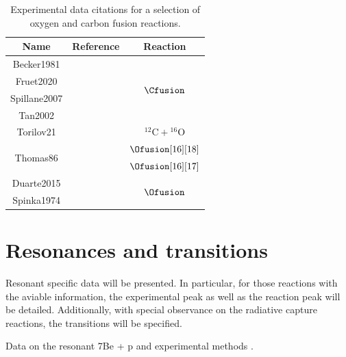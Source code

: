 \documentclass[openany]{book}
\begin{document}
 
\begin{table}[H]
	\centering
	\begin{tabular}{|c|c|c|}
		\hline
		Name & Reference & Reaction \\ \hline
		Becker1981 &   \cite{becker_kettner_rolfs_trautvetter_1981}  &    \multirow{4}{*}{$\Cfusion$} \\ \cline{1-2}
		Fruet2020 &  \cite{fruet_courtin_heine_jenkins_adsley_brown_canavan_catford_charon_curien_et_2020}          & \\ \cline{1-2}
		Spillane2007 &   \cite{spillane_raiola_rolfs_schurmann_strieder_zeng_becker_bordeanu_gialanella_romano_et_2007}  &   \\ \cline{1-2}
		Tan2002 &    \cite{tan_boeltzig_dulal_deboer_frentz_henderson_howard_kelmar_kolata_long_et_2020}  & \\ \hline
		Torilov21  &  \cite{torilov_maltsev_zherebchevsky_2021}     & $\mathrm{{}^{12}C + {}^{16}O}$       \\ \hline
		\multirow{2}{*}{Thomas86} & \multirow{2}{*}{  \cite{thomas_chen_hinds_meredith_olson_1986} }  &     $\Ofusion[16][18]$  \\ \cline{3-3} 
	 	 &  &     $\Ofusion[16][17]$ \\ \hline
		Duarte2015  &   \cite{duarte_gasques_oliveira_zagatto_chamon_medina_added_seale_alcantara-nunez_rossi_et_2015} & \multirow{2}{*}{ $\Ofusion$}  \\ \cline{1-2} 
		Spinka1974   &  \cite{spinka_winkler_1974}  &  \\ \hline
	\end{tabular}
	\caption[References oxygen and carbon fusion experimental data]{Experimental data citations for a selection of oxygen and carbon fusion reactions.}
\label{table:fusion}
\end{table}
 
\section{Resonances and transitions} \label{sec:resonancesTransitions}

Resonant specific data will be presented. In particular, for those reactions with the aviable information, the experimental peak as well as the reaction peak will be detailed. Additionally, with special observance on the radiative capture reactions, the transitions will be specified.

Data on the resonant 7Be + p and experimental methods \cite{buompane_dileva_gialanella_d'onofrio_decesare_duarte_fulop_gasques_gyurky_morales-gallegos_et_2022}. \\
\end{document}
